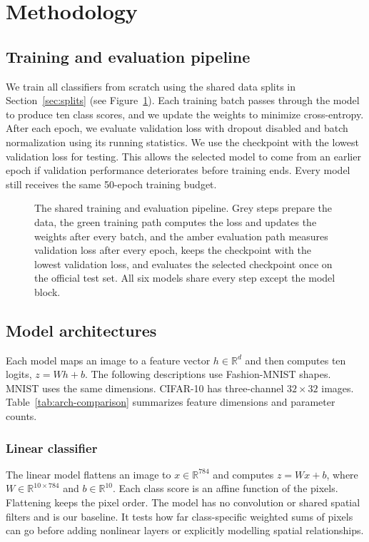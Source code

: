 \section{Methodology}
\label{sec:methods}

\subsection{Training and evaluation pipeline}
We train all classifiers from scratch using the shared data splits in
Section~\ref{sec:splits} (see Figure~\ref{fig:pipeline}). Each training batch passes through the model to produce
ten class scores, and we update the weights to minimize cross-entropy.
After each epoch, we evaluate validation loss with dropout disabled and batch
normalization using its running statistics. We use the checkpoint with the
lowest validation loss for testing. This allows the selected model to come
from an earlier epoch if validation performance deteriorates before training
ends. Every model still receives the same 50-epoch training budget.

\begin{figure}[htbp]
\centering

\caption{The shared training and evaluation pipeline. Grey steps prepare the
data, the green training path computes the loss and updates the weights after
every batch, and the amber evaluation path measures validation loss after every
epoch, keeps the checkpoint with the lowest validation loss, and evaluates the
selected checkpoint once on the official test set. All six models share every
step except the model block.}
\label{fig:pipeline}
\end{figure}

\subsection{Model architectures}
\label{sec:architectures}
Each model maps an image to a feature vector $h\in\mathbb{R}^{d}$ and then
computes ten logits, $z=Wh+b$. The following descriptions use Fashion-MNIST
shapes. MNIST uses the same dimensions. CIFAR-10 has three-channel
$32\times32$ images. Table~\ref{tab:arch-comparison} summarizes feature
dimensions and parameter counts.

\subsubsection{Linear classifier}
The linear model flattens an image to $x\in\mathbb{R}^{784}$ and computes
$z=Wx+b$, where $W\in\mathbb{R}^{10\times784}$ and $b\in\mathbb{R}^{10}$.
Each class score is an affine function of the pixels. Flattening keeps the pixel
order. The model has no convolution or shared spatial filters and is our baseline. It tests how far class-specific weighted sums of pixels can go before adding
nonlinear layers or explicitly modelling spatial relationships.


